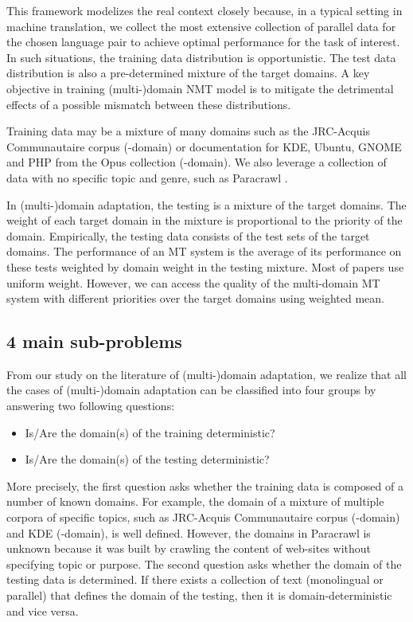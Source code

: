 This framework modelizes the real context closely because, in a typical setting in machine translation, we collect the most extensive collection of parallel data for the chosen language pair to achieve optimal performance for the task of interest. In such situations, the training data distribution is opportunistic. The test data distribution is also a pre-determined mixture of the target domains. A key objective in training (multi-)domain NMT model is to mitigate the detrimental effects of a possible mismatch between these distributions. 

Training data may be a mixture of many domains such as the JRC-Acquis Communautaire corpus (-domain) \citep{Steinberger06acquis} or documentation for KDE, Ubuntu, GNOME and PHP from the Opus collection \citep{Tiedemann09news} (-domain). We also leverage a collection of data with no specific topic and genre, such as Paracrawl \citep{Banon20Paracrawl}. 

In (multi-)domain adaptation, the testing is a mixture of the target domains. The weight of each target domain in the mixture is proportional to the priority of the domain. Empirically, the testing data consists of the test sets of the target domains. The performance of an MT system is the average of its performance on these tests weighted by domain weight in the testing mixture. Most of papers use uniform weight. However, we can access the quality of the multi-domain MT system with different priorities over the target domains using weighted mean.

\subsection{4 main sub-problems}
From our study on the literature of (multi-)domain adaptation, we realize that all the cases of (multi-)domain adaptation can be classified into four groups by answering two following questions:
\begin{itemize}
	\item Is/Are the domain(s) of the training deterministic?
	\item Is/Are the domain(s) of the testing deterministic?
\end{itemize}
More precisely, the first question asks whether the training data is composed of a number of known domains. For example, the domain of a mixture of multiple corpora of specific topics, such as JRC-Acquis Communautaire corpus (-domain) and KDE (-domain), is well defined. However, the domains in Paracrawl \citep{Banon20Paracrawl} is unknown because it was built by crawling the content of web-sites without specifying topic or purpose. The second question asks whether the domain of the testing data is determined. If there exists a collection of text (monolingual or parallel) that defines the domain of the testing, then it is domain-deterministic and vice versa. 

